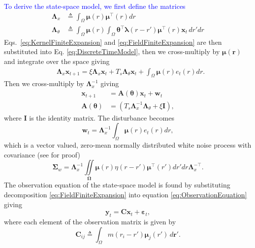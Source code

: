 \documentclass[journal,a4paper]{IEEEtran}
\newcommand{\parham}[1]{\textcolor{blue}{#1}}
\begin{document}
\parham{To derive the state-space model, we first define the matrices}
\begin{align}\label{eq:Lambdax}
 \mathbf{\Lambda}_{x} &\triangleq \int_{\Omega}\boldsymbol\mu\left(r\right)\boldsymbol\mu^\top\left(r\right) dr \\
\label{eq:Lambdatheta}
 \mathbf{\Lambda}_{\theta} &\triangleq \int_{\Omega}\boldsymbol\mu\left(r\right) \int_\Omega { 
	   \boldsymbol\theta^\top\boldsymbol\lambda\left(r-r'\right)
	    \boldsymbol\mu^\top\left(r\right)\mathbf{x}_t 
	\, dr'dr}
\end{align}
Eqs.~\eqref{eq:KernelFiniteExpansion} and \eqref{eq:FieldFiniteExpansion} are then substituted into Eq. \eqref{eq:DiscreteTimeModel}, then we cross-multiply by $\boldsymbol\mu\left(\mathbf r\right)$ and integrate over the space giving
\begin{align}\label{eq:DecomposedModel2} 
	&\mathbf{\Lambda}_{x} \mathbf{x}_{t+1}= 
	\xi\mathbf{\Lambda}_{x} \mathbf{x}_t +T_s \mathbf{\Lambda}_{\theta}\mathbf{x}_t +\int_{\Omega}\boldsymbol\mu\left(r\right)e_t\left(r\right)dr.
\end{align}
Then we cross-multiply by $\mathbf{\Lambda}_{x}^{-1}$ giving
\begin{align}\label{eq:StateEquation}
 \mathbf x_{t+1} &=\mathbf A(\boldsymbol \theta) \mathbf x_t+ \mathbf w_t\\
\label{eq:A_theta}
 \mathbf A(\boldsymbol \theta) &= (T_s\mathbf{\Lambda}_{x}^{-1}\mathbf{\Lambda}_{\theta}+\xi\mathbf I),
\end{align}
where $\mathbf I$ is the identity matrix. The disturbance becomes 
\begin{equation}\label{eq:Disturbance}
\mathbf w_t= \mathbf{\Lambda}_{x}^{-1}\int_{\Omega}\boldsymbol\mu \left(r\right)e_t\left(r\right)dr,
\end{equation}
which is a vector valued, zero-mean normally distributed white noise process with covariance (see \cite{Scerri2009} for proof)
\begin{equation}
\boldsymbol\Sigma_w =\mathbf{\Lambda}_{x}^{-1}\iint\limits_{\boldsymbol\Omega}\boldsymbol\mu\left(r\right) \eta\left(r-r'\right)\boldsymbol\mu^{\top}\left(r'\right)dr'dr\mathbf{\Lambda}_{x}^{-\top}.
\end{equation}
The observation equation of the state-space model is found by substituting decomposition \eqref{eq:FieldFiniteExpansion}
 into equation \eqref{eq:ObservationEquation} giving
\begin{equation}\label{eq:ReducedObservationEquation} 
	\mathbf{y}_t = \mathbf{C}\mathbf{x}_t + \boldsymbol{\varepsilon}_t,
\end{equation}
where each element of the observation matrix is given by
\begin{equation}
	\mathbf{C}_{ij} \triangleq \int_{\Omega}m(r_i - r')\boldsymbol{\mu}_j(r') \, d\mathbf{r}'.
\end{equation}
\end{document}
